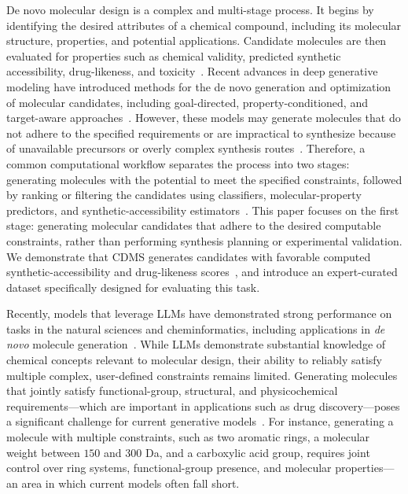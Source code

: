 \documentclass[10pt]{article} %
\begin{document}
    De novo molecular design is a complex and multi-stage process. It begins by identifying the desired attributes of a chemical compound, including its molecular structure, properties, and potential applications. Candidate molecules are then evaluated for properties such as chemical validity, predicted synthetic accessibility, drug-likeness, and toxicity~\cite{brown2019guacamol,parrot2023syntheticaccessibility}. Recent advances in deep generative modeling have introduced methods for the de novo generation and optimization of molecular candidates, including goal-directed, property-conditioned, and target-aware approaches~\citep{jin2018junction,you2018graph,hoogeboom2022equivariant,wu2024tamgen}. However, these models may generate molecules that do not adhere to the specified requirements or are impractical to synthesize because of unavailable precursors or overly complex synthesis routes~\cite{gao2020synthesizability}. Therefore, a common computational workflow separates the process into two stages: generating molecules with the potential to meet the specified constraints, followed by ranking or filtering the candidates using classifiers, molecular-property predictors, and synthetic-accessibility estimators~\cite{parrot2023syntheticaccessibility,guo2025synthesizability}. This paper focuses on the first stage: generating molecular candidates that adhere to the desired computable constraints, rather than performing synthesis planning or experimental validation. We demonstrate that CDMS generates candidates with favorable computed synthetic-accessibility and drug-likeness scores~\cite{ertl2009sascore,bickerton2012qed}, and introduce an expert-curated dataset specifically designed for evaluating this task.

    Recently, models that leverage LLMs have demonstrated strong performance on tasks in the natural sciences and cheminformatics, including applications in \textit{de novo} molecule generation~\cite{molregpt,zhang2024chemllm,CIQA}. While LLMs demonstrate substantial knowledge of chemical concepts relevant to molecular design, their ability to reliably satisfy multiple complex, user-defined constraints remains limited. Generating molecules that jointly satisfy functional-group, structural, and physicochemical requirements---which are important in applications such as drug discovery---poses a significant challenge for current generative models~\cite{fu2021mimosa}. For instance, generating a molecule with multiple constraints, such as two aromatic rings, a molecular weight between $150$ and $300$ Da, and a carboxylic acid group, requires joint control over ring systems, functional-group presence, and molecular properties---an area in which current models often fall short.
    
\end{document}
